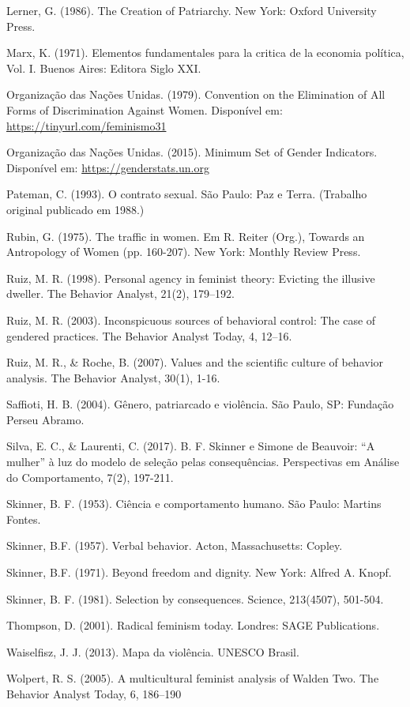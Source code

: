 \hangindent=25pt
\noindent Lerner, G. (1986). The Creation of Patriarchy. New York: Oxford University Press.

\hangindent=25pt
\noindent Marx, K. (1971). Elementos fundamentales para la critica de la economia política, Vol. I. Buenos Aires: Editora Siglo XXI.

\hangindent=25pt
\noindent Organização das Nações Unidas. (1979). Convention on the Elimination of All Forms of Discrimination Against Women. Disponível em: \url{https://tinyurl.com/feminismo31}

\hangindent=25pt
\noindent Organização das Nações Unidas. (2015). Minimum Set of Gender Indicators. Disponível em: \url{https://genderstats.un.org}

\hangindent=25pt
\noindent Pateman, C. (1993). O contrato sexual. São Paulo: Paz e Terra. (Trabalho original publicado em 1988.)

\hangindent=25pt
\noindent Rubin, G. (1975). The traffic in women. Em R. Reiter (Org.), Towards an Antropology of Women (pp. 160-207). New York: Monthly Review Press.

\hangindent=25pt
\noindent Ruiz, M. R. (1998). Personal agency in feminist theory: Evicting the illusive dweller. The Behavior Analyst, 21(2), 179–192.

\hangindent=25pt
\noindent Ruiz, M. R. (2003). Inconspicuous sources of behavioral control: The case of gendered practices. The Behavior Analyst Today, 4, 12–16.

\hangindent=25pt
\noindent Ruiz, M. R., \& Roche, B. (2007). Values and the scientific culture of behavior analysis. The Behavior Analyst, 30(1), 1-16.

\hangindent=25pt
\noindent Saffioti, H. B. (2004). Gênero, patriarcado e violência. São Paulo, SP: Fundação Perseu Abramo.

\hangindent=25pt
\noindent Silva, E. C., \& Laurenti, C. (2017). B. F. Skinner e Simone de Beauvoir: ``A mulher'' à luz do modelo de seleção pelas consequências. Perspectivas em Análise do Comportamento, 7(2), 197-211. 

\hangindent=25pt
\noindent Skinner, B. F. (1953). Ciência e comportamento humano. São Paulo: Martins Fontes.

\hangindent=25pt
\noindent Skinner, B.F. (1957). Verbal behavior. Acton, Massachusetts: Copley.

\hangindent=25pt
\noindent Skinner, B.F. (1971). Beyond freedom and dignity. New York: Alfred A. Knopf.

\hangindent=25pt
\noindent Skinner, B. F. (1981). Selection by consequences. Science, 213(4507), 501-504.

\hangindent=25pt
\noindent Thompson, D. (2001). Radical feminism today. Londres: SAGE Publications.

\hangindent=25pt
\noindent Waiselfisz, J. J. (2013). Mapa da violência. UNESCO Brasil.

\hangindent=25pt
\noindent Wolpert, R. S. (2005). A multicultural feminist analysis of Walden Two. The Behavior Analyst Today, 6, 186–190